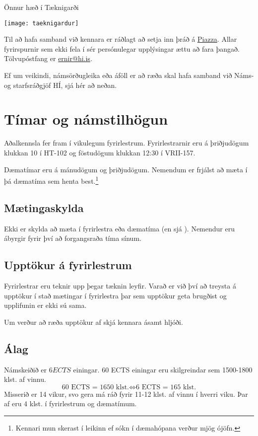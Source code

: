 \documentclass[justified, nobib]{tufte-handout}
\begin{document}
\begin{marginfigure}
    \caption{Önnur hæð í Tæknigarði}
    \label{fig:taeknigardur}
    \begin{center}
    \texttt{[image: taeknigardur]}
    \end{center}
\end{marginfigure}

Til að hafa samband við kennara er ráðlagt að setja inn þráð á \href{piazza.com/hi.is/fall2017/tl105g/home}{Piazza}. Allar fyrirspurnir sem ekki fela í sér persónulegar upplýsingar ættu að fara þangað. Tölvupóstfang er \href{mailto:ernir@hi.is}{ernir@hi.is}.

Ef um veikindi, námsörðugleika eða áföll er að ræða skal hafa samband við Náms- og starfsráðgjöf HÍ, sjá  hér að neðan.

\section{Tímar og námstilhögun}
Aðalkennsla fer fram í vikulegum fyrirlestrum. Fyrirlestrarnir eru á þriðjudögum klukkan 10 í HT-102 og föstudögum klukkan 12:30 í VRII-157.

Dæmatímar eru á mánudögum og þriðjudögum. Nemendum er frjálst að mæta í þá dæmatíma sem henta best.\footnote{Kennari mun skerast í leikinn ef sókn í dæmahópana verður mjög ójöfn.}

\subsection{Mætingaskylda}
Ekki er skylda að mæta í fyrirlestra eða dæmatíma (en sjá ). Nemendur eru ábyrgir fyrir því að forgangsraða tíma sínum.
\subsection{Upptökur á fyrirlestrum}
Fyrirlestrar eru teknir upp þegar tæknin leyfir. Varað er við því að treysta á upptökur í stað mætingar í fyrirlestra þar sem upptökur geta brugðist og upplifunin er ekki sú sama.

Um verður að ræða upptökur af skjá kennara ásamt hljóði.
\subsection{Álag}
Námskeiðið er $6 ECTS$ einingar. 60 ECTS einingar eru skilgreindar sem 1500-1800 klst. af vinnu.
\[
\text{60 ECTS = 1650 klst.} \Longleftrightarrow \text{6 ECTS = 165 klst.}
\]
Misserið er 14 vikur, svo gera má ráð fyrir 11-12 klst. af vinnu í hverri viku. Þar af eru 4 klst. í fyrirlestrum og dæmatímum.
\end{document}
